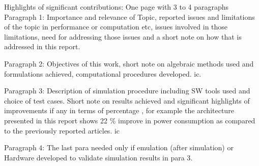 \vspace{-1cm}


Highlights of significant contributions: One page with 3 to 4 paragraphs\\

Paragraph 1: Importance and relevance of Topic, reported issues and limitations of the topic in performance or computation etc, issues involved in those limitations, need for addressing those issues and a short note on how that is addressed in this report.


Paragraph 2: Objectives of this work, short note on algebraic methods used and formulations achieved, computational procedures developed. \gls{ic}.


Paragraph 3: Description of simulation procedure including SW tools used and choice of test cases. Short note on results achieved and significant highlights of improvements if any in terms of percentage , for example the architecture presented in this report shows 22 \% improve in power consumption as compared to the previously reported articles.
\gls{ic}

Paragraph 4: The last para needed only if emulation (after simulation) or Hardware developed to validate simulation results in para 3. 

\pagebreak